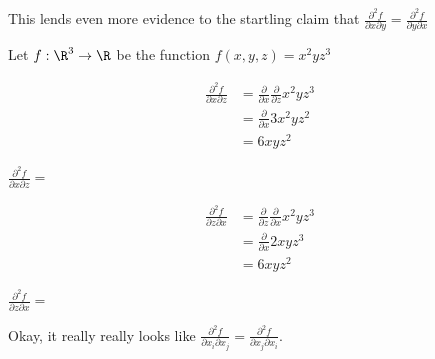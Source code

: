 \documentclass{ximera}
\begin{document}
\begin{question}
		This lends even more evidence to the startling claim that $\frac{\partial^2 f}{\partial x \partial y} = \frac{\partial^2 f}{\partial y \partial x}$
	\end{question}
	
	\begin{question}
		Let $f:\R^3 \to \R$ be the function $f(x,y,z) = x^2yz^3$
		\begin{solution}
			\begin{hint}
				\begin{align*}
					\frac{\partial^2 f}{\partial x \partial z} &= \frac{\partial }{ \partial x} \frac{\partial}{ \partial z} x^2yz^3\\
						&=\frac{\partial }{ \partial x} 3x^2yz^2\\
						&= 6xyz^2
				\end{align*}
			\end{hint}
			$\frac{\partial^2 f}{\partial x \partial z} = $
		\end{solution}
		\begin{solution}
		\begin{hint}
				\begin{align*}
					\frac{\partial^2 f}{\partial z \partial x} &= \frac{\partial }{ \partial z} \frac{\partial}{ \partial x} x^2yz^3\\
						&=\frac{\partial }{ \partial x} 2xyz^3\\
						&= 6xyz^2
				\end{align*}
			\end{hint}
			$\frac{\partial^2 f}{\partial z \partial x} = $\answer{$6xyz^2$}
		\end{solution}
		
		Okay, it really really looks like $\frac{\partial^2 f}{\partial x_i \partial x_j} = \frac{\partial^2 f}{\partial x_j \partial x_i} $.
		\end{question}
	
\end{document}
